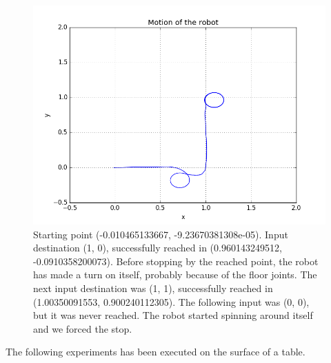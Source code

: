 \documentclass[a4paper,11pt,oneside]{book}
\begin{document}
\begin{figure}[H]
\begin{center}
\includegraphics[width=1\textwidth]{figs/experiments/3_1}
\caption[Experiment: Destinations (1, 0), (1, 1), (0, 0)]{Starting point (-0.010465133667, -9.23670381308e-05). Input destination (1, 0), successfully reached in (0.960143249512, -0.0910358200073). Before stopping by the reached point, the robot has made a turn on itself, probably because of the floor joints. The next input destination was (1, 1), successfully reached in (1.00350091553, 0.900240112305). The following input was (0, 0), but it was never reached. The robot started spinning around itself and we forced the stop.}
\end{center}
\end{figure}

The following experiments has been executed on the surface of a table.
\end{document}
